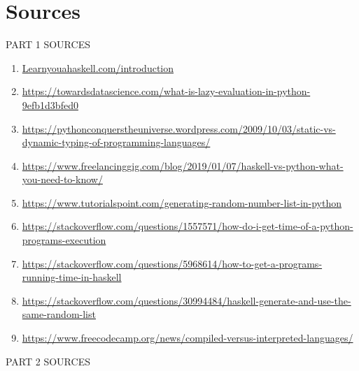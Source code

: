 \documentclass{article}
\begin{document}
\section{Sources}
PART 1 SOURCES
\begin{enumerate}
\item \href {http://learnyouahaskell.com/introduction}{Learnyouahaskell.com/introduction}
\item \href {https://towardsdatascience.com/what-is-lazy-evaluation-in-python-9efb1d3bfed0} {https://towardsdatascience.com/what-is-lazy-evaluation-in-python-9efb1d3bfed0}
\item \href {https://pythonconquerstheuniverse.wordpress.com/2009/10/03/static-vs-dynamic-typing-of-programming-languages/} {https://pythonconquerstheuniverse.wordpress.com/2009/10/03/static-vs-dynamic-typing-of-programming-languages/}
\item\href {https://www.freelancinggig.com/blog/2019/01/07/haskell-vs-python-what-you-need-to-know/}{https://www.freelancinggig.com/blog/2019/01/07/haskell-vs-python-what-you-need-to-know/}
\item\href {https://www.tutorialspoint.com/generating-random-number-list-in-python}{https://www.tutorialspoint.com/generating-random-number-list-in-python}
\item\href{https://stackoverflow.com/questions/1557571/how-do-i-get-time-of-a-python-programs-execution}{https://stackoverflow.com/questions/1557571/how-do-i-get-time-of-a-python-programs-execution}
\item\href{https://stackoverflow.com/questions/5968614/how-to-get-a-programs-running-time-in-haskell}{https://stackoverflow.com/questions/5968614/how-to-get-a-programs-running-time-in-haskell}
\item\href{https://stackoverflow.com/questions/30994484/haskell-generate-and-use-the-same-random-list}{https://stackoverflow.com/questions/30994484/haskell-generate-and-use-the-same-random-list}
\item\href{https://www.freecodecamp.org/news/compiled-versus-interpreted-languages/}{https://www.freecodecamp.org/news/compiled-versus-interpreted-languages/}
\end{enumerate}
PART 2 SOURCES
\end{document}
